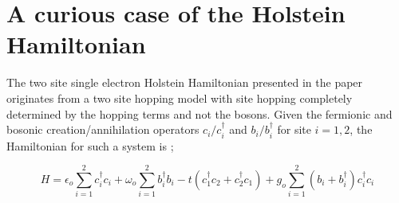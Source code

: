 \documentclass{article}
\begin{document}
\section{A curious case of the Holstein Hamiltonian}
The two site single electron Holstein Hamiltonian presented in the paper originates from a two site hopping model with site hopping completely determined by the hopping terms and not the bosons. Given the fermionic and bosonic creation/annihilation operators $c_i/c_i^\dagger$ and $b_i/b_i^\dagger$ for site $i = 1,2$, the Hamiltonian for such a system is \cite{gunnarsson_corrections_1994} ;

\begin{equation}
    H = \epsilon_o\sum_{i=1}^2 c_i^\dagger c_i + \omega_o \sum_{i=1}^2 b_i^\dagger b_i - t(c_1^\dagger c_2 + c_2^\dagger c_1)+ g_o\sum_{i=1}^2(b_i + b_i^\dagger)c_i^\dagger c_i
\end{equation}
\end{document}
